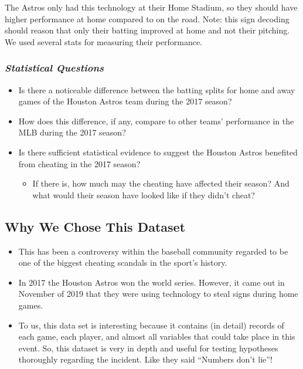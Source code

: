 \documentclass[
]{article}
\providecommand{\tightlist}{%
  \setlength{\itemsep}{0pt}\setlength{\parskip}{0pt}}
\begin{document}
The Astros only had this technology at their Home Stadium, so they
should have higher performance at home compared to on the road. Note:
this sign decoding should reason that only their batting improved at
home and not their pitching. We used several stats for measuring their
performance.

\hypertarget{statistical-questions}{%
\subsubsection{\texorpdfstring{\emph{Statistical
Questions}}{Statistical Questions}}\label{statistical-questions}}

\begin{itemize}
\tightlist
\item
  Is there a noticeable difference between the batting splits for home
  and away games of the Houston Astros team during the 2017 season?
\item
  How does this difference, if any, compare to other teams' performance
  in the MLB during the 2017 season?
\item
  Is there sufficient statistical evidence to suggest the Houston Astros
  benefited from cheating in the 2017 season?

  \begin{itemize}
  \tightlist
  \item
    If there is, how much may the cheating have affected their season?
    And what would their season have looked like if they didn't cheat?
  \end{itemize}
\end{itemize}

\hypertarget{why-we-chose-this-dataset}{%
\subsection{Why We Chose This Dataset}\label{why-we-chose-this-dataset}}

\begin{itemize}
\tightlist
\item
  This has been a controversy within the baseball community regarded to
  be one of the biggest cheating scandals in the sport's history.
\item
  In 2017 the Houston Astros won the world series. However, it came out
  in November of 2019 that they were using technology to steal signs
  during home games.
\item
  To us, this data set is interesting because it contains (in detail)
  records of each game, each player, and almost all variables that could
  take place in this event. So, this dataset is very in depth and useful
  for testing hypotheses thoroughly regarding the incident. Like they
  said ``Numbers don't lie''!
\end{itemize}
\end{document}
